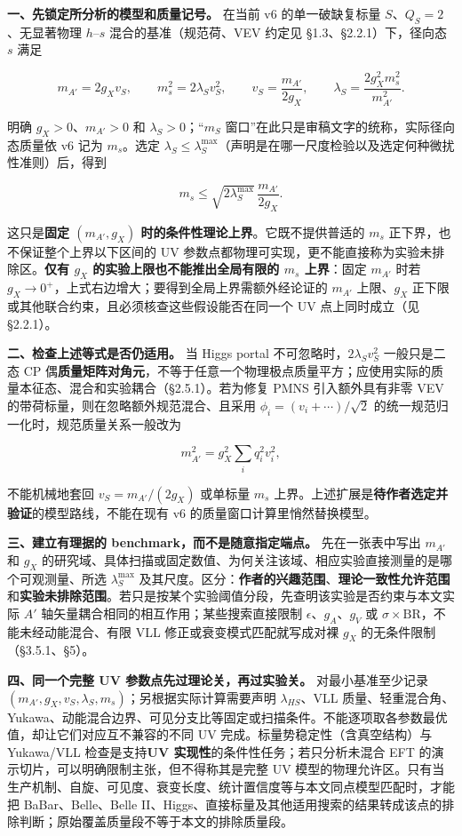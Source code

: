 \documentclass[
]{article}
\begin{document}
\textbf{一、先锁定所分析的模型和质量记号。} 在当前 v6 的单一破缺复标量
\(S\)、\(Q_S=2\)、无显著物理 \(h\)--\(s\) 混合的基准（规范荷、VEV 约定见
§1.3、§2.2.1）下，径向态 \(s\) 满足

\[
 m_{A'}=2g_Xv_S,\qquad m_s^2=2\lambda_Sv_S^2,\qquad
 v_S=\frac{m_{A'}}{2g_X},\qquad
 \lambda_S=\frac{2g_X^2m_s^2}{m_{A'}^2}.
\]

明确 \(g_X>0\)、\(m_{A'}>0\) 和 \(\lambda_S>0\)；``\(m_S\)
窗口''在此只是审稿文字的统称，实际径向态质量依 v6 记为 \(m_s\)。选定
\(\lambda_S\leq\lambda_S^{\max}\)（声明是在哪一尺度检验以及选定何种微扰性准则）后，得到

\[
 m_s\leq\sqrt{2\lambda_S^{\max}}\,\frac{m_{A'}}{2g_X}.
\]

这只是\textbf{固定 \((m_{A'},g_X)\)
时的条件性理论上界}。它既不提供普适的 \(m_s\)
正下界，也不保证整个上界以下区间的 UV
参数点都物理可实现，更不能直接称为实验未排除区。\textbf{仅有 \(g_X\)
的实验上限也不能推出全局有限的 \(m_s\) 上界}：固定 \(m_{A'}\) 时若
\(g_X\to0^+\)，上式右边增大；要得到全局上界需额外经论证的 \(m_{A'}\)
上限、\(g_X\) 正下限或其他联合约束，且必须核查这些假设能否在同一个 UV
点上同时成立（见 §2.2.1）。

\textbf{二、检查上述等式是否仍适用。} 当 Higgs portal
不可忽略时，\(2\lambda_Sv_S^2\) 一般只是二态 CP
偶\textbf{质量矩阵对角元}，不等于任意一个物理极点质量平方；应使用实际的质量本征态、混合和实验耦合（§2.5.1）。若为修复
PMNS 引入额外具有非零 VEV 的带荷标量，则在忽略额外规范混合、且采用
\(\phi_i=(v_i+\cdots)/\sqrt2\) 的统一规范归一化时，规范质量关系一般改为

\[
 m_{A'}^2=g_X^2\sum_i q_i^2v_i^2,
\]

不能机械地套回 \(v_S=m_{A'}/(2g_X)\) 或单标量 \(m_s\)
上界。上述扩展是\textbf{待作者选定并验证}的模型路线，不能在现有 v6
的质量窗口计算里悄然替换模型。

\textbf{三、建立有理据的 benchmark，而不是随意指定端点。}
先在一张表中写出 \(m_{A'}\) 和 \(g_X\)
的研究域、具体扫描或固定数值、为何关注该域、相应实验直接测量的是哪个可观测量、所选
\(\lambda_S^{\max}\)
及其尺度。区分：\textbf{作者的兴趣范围}、\textbf{理论一致性允许范围}和\textbf{实验未排除范围}。若只是按某个实验阈值分段，先查明该实验是否约束与本文实际
\(A'\) 轴矢量耦合相同的相互作用；某些搜索直接限制
\(\epsilon\)、\(g_A\)、\(g_V\) 或
\(\sigma\times\mathrm{BR}\)，不能未经动能混合、有限 VLL
修正或衰变模式匹配就写成对裸 \(g_X\) 的无条件限制（§3.5.1、§5）。

\textbf{四、同一个完整 UV 参数点先过理论关，再过实验关。}
对最小基准至少记录
\((m_{A'},g_X,v_S,\lambda_S,m_s)\)；另根据实际计算需要声明
\(\lambda_{HS}\)、VLL
质量、轻重混合角、Yukawa、动能混合边界、可见分支比等固定或扫描条件。不能逐项取各参数最优值，却让它们对应互不兼容的不同
UV 完成。标量势稳定性（含真空结构）与 Yukawa/VLL 检查是支持\textbf{UV
实现性}的条件性任务；若只分析未混合 EFT
的演示切片，可以明确限制主张，但不得称其是完整 UV
模型的物理允许区。只有当生产机制、自旋、可见度、衰变长度、统计置信度等与本文同点模型匹配时，才能把
BaBar、Belle、Belle
II、Higgs、直接标量及其他适用搜索的结果转成该点的排除判断；原始覆盖质量段不等于本文的排除质量段。
\end{document}
